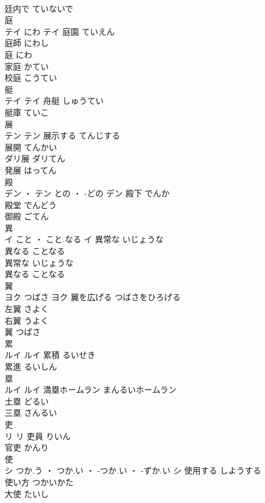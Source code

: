 \documentclass[8pt]{extreport}
\begin{document}
\begin{CJK}{UTF8}{min}
\\	廷内で	ていないで	
\\	庭	
\\	テイ	にわ	テイ	庭園	ていえん	
\\	庭師	にわし	
\\	庭	にわ	
\\	家庭	かてい	
\\	校庭	こうてい	
\\	艇	
\\	テイ		テイ	舟艇	しゅうてい	
\\	艇庫	ていこ	
\\	展	
\\	テン		テン	展示する	てんじする	
\\	展開	てんかい	
\\	ダリ展	ダリてん	
\\	発展	はってん	
\\	殿	
\\	デン ・ テン	との ・ -どの	デン	殿下	でんか	
\\	殿堂	でんどう	
\\	御殿	ごてん	
\\	異	
\\	イ	こと ・ こと.なる	イ	異常な	いじょうな	
\\	異なる	ことなる	
\\	異常な	いじょうな	
\\	異なる	ことなる	
\\	翼	
\\	ヨク	つばさ	ヨク	翼を広げる	つばさをひろげる	
\\	左翼	さよく	
\\	右翼	うよく	
\\	翼	つばさ	
\\	累	
\\	ルイ		ルイ	累積	るいせき	
\\	累進	るいしん	
\\	塁	
\\	ルイ		ルイ	満塁ホームラン	まんるいホームラン	
\\	土塁	どるい	
\\	三塁	さんるい	
\\	吏	
\\	リ		リ	吏員	りいん	
\\	官吏	かんり	
\\	使	
\\	シ	つか.う ・ つか.い ・ -つか.い ・ -ずか.い	シ	使用する	しようする	
\\	使い方	つかいかた	
\\	大使	たいし	

\end{CJK}
\end{document}
